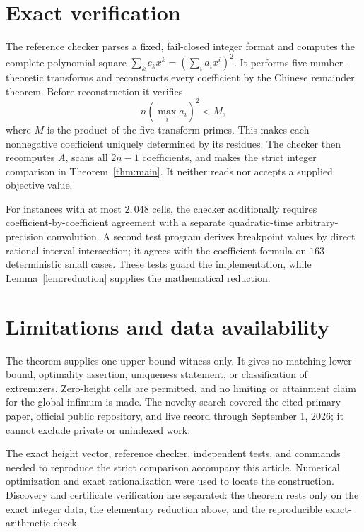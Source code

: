 \documentclass[11pt]{amsart}
\begin{document}
\section{Exact verification}
The reference checker parses a fixed, fail-closed integer format and computes
the complete polynomial square $\sum_k c_kx^k=(\sum_i a_ix^i)^2$. It performs
five number-theoretic transforms and reconstructs every coefficient by the
Chinese remainder theorem. Before reconstruction it verifies
\[
 n(\max_i a_i)^2 < M,
\]
where $M$ is the product of the five transform primes. This makes each
nonnegative coefficient uniquely determined by its residues. The checker
then recomputes $A$, scans all $2n-1$ coefficients, and makes the strict
integer comparison in Theorem~\ref{thm:main}. It neither reads nor accepts a
supplied objective value.

For instances with at most $2{,}048$ cells, the checker additionally requires
coefficient-by-coefficient agreement with a separate quadratic-time
arbitrary-precision convolution. A second test program derives breakpoint
values by direct rational interval intersection; it agrees with the
coefficient formula on $163$ deterministic small cases. These tests guard the
implementation, while Lemma~\ref{lem:reduction} supplies the mathematical
reduction.

\section{Limitations and data availability}
The theorem supplies one upper-bound witness only. It gives no matching lower
bound, optimality assertion, uniqueness statement, or classification of
extremizers. Zero-height cells are permitted, and no limiting or attainment
claim for the global infimum is made. The novelty search covered the cited
primary paper, official public repository, and live record through September
1, 2026; it cannot exclude private or unindexed work.

The exact height vector, reference checker, independent tests, and commands
needed to reproduce the strict comparison accompany this article. Numerical
optimization and exact rationalization were used to locate the construction.
Discovery and certificate verification are separated: the theorem rests only
on the exact integer data, the elementary reduction above, and the
reproducible exact-arithmetic check.

\enlargethispage{5\baselineskip}


\end{document}
